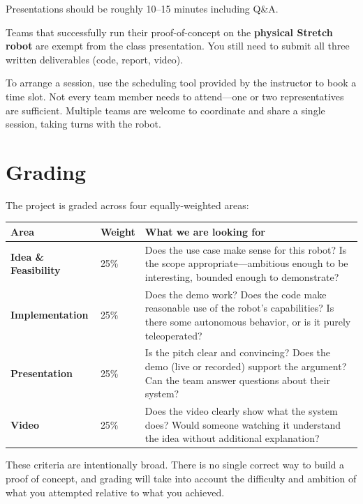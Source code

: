 \documentclass[11pt,a4paper]{article}
\begin{document}
Presentations should be roughly 10--15 minutes including Q\&A.

\begin{bonusbox}
Teams that successfully run their proof-of-concept on the \textbf{physical Stretch robot} are exempt from the class presentation. You still need to submit all three written deliverables (code, report, video).

To arrange a session, use the scheduling tool provided by the instructor to book a time slot. Not every team member needs to attend---one or two representatives are sufficient. Multiple teams are welcome to coordinate and share a single session, taking turns with the robot.
\end{bonusbox}

\section*{Grading}

The project is graded across four equally-weighted areas:

\begin{center}
\begin{tabular}{llp{8.5cm}}
\toprule
\textbf{Area} & \textbf{Weight} & \textbf{What we are looking for} \\
\midrule
\textbf{Idea \& Feasibility} & 25\% &
    Does the use case make sense for this robot? Is the scope appropriate---ambitious enough to be interesting, bounded enough to demonstrate? \\[6pt]
\textbf{Implementation} & 25\% &
    Does the demo work? Does the code make reasonable use of the robot's capabilities? Is there some autonomous behavior, or is it purely teleoperated? \\[6pt]
\textbf{Presentation} & 25\% &
    Is the pitch clear and convincing? Does the demo (live or recorded) support the argument? Can the team answer questions about their system? \\[6pt]
\textbf{Video} & 25\% &
    Does the video clearly show what the system does? Would someone watching it understand the idea without additional explanation? \\
\bottomrule
\end{tabular}
\end{center}

\begin{notebox}
These criteria are intentionally broad. There is no single correct way to build a proof of concept, and grading will take into account the difficulty and ambition of what you attempted relative to what you achieved.
\end{notebox}
\end{document}
